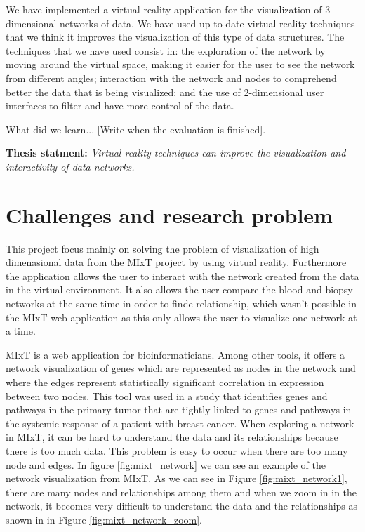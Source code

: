 We have implemented a virtual reality application for the visualization of 3-dimensional networks of data. We have used  up-to-date virtual reality techniques that we think it improves the visualization of this type of data structures. The techniques that we have used consist in: the exploration of the network by moving around the virtual space, making it easier for the user to see the network from different angles; interaction with the network and nodes to comprehend better the data that is being visualized; and the use of 2-dimensional user interfaces to filter and have more control of the data.

What did we learn... [Write when the evaluation is finished].

\textbf{Thesis statment: } \emph{Virtual reality techniques can improve the visualization and interactivity of data networks.}

\section{Challenges and research problem}
This project focus mainly on solving the problem of visualization of high dimenasional data from the MIxT project by using virtual reality. Furthermore the application allows the user to interact with the network created from the data in the virtual environment. It also allows the user compare the blood and biopsy networks at the same time in order to finde relationship, which wasn't possible in the MIxT web application as this only allows the user to visualize one network at a time.

MIxT\cite{fjukstad_dumeaux_olsen_lund_hallett_bongo_2017} is a web application for bioinformaticians. Among other tools, it offers a network visualization of genes which are represented as nodes in the network and where the edges represent statistically significant correlation in expression between two nodes. This tool was used in a study\cite{dumeaux_fjukstad_interactions_tumor_blood} that identifies genes and pathways in the primary tumor that are tightly linked to genes and pathways in the systemic response of a patient with breast cancer.
When exploring a network in MIxT, it can be hard to understand the data and its relationships because there is too much data. This problem is easy to occur when there are too many node and edges. In figure \ref{fig:mixt_network} we can see an example of the network visualization from MIxT. As we can see in Figure \ref{fig:mixt_network1}, there are many nodes and relationships among them and when we zoom in in the network, it becomes very difficult to understand the data and the relationships as shown in in Figure \ref{fig:mixt_network_zoom}.

